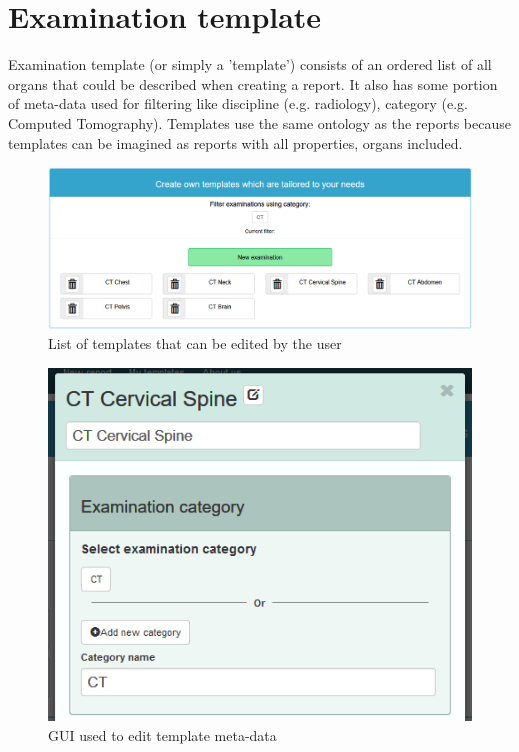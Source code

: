 \documentclass[12pt, twoside, openany]{report}
\theoremstyle{definition}
\begin{document}
\section{Examination template}
Examination template (or simply a 'template') consists of an ordered list of all organs that could be described when creating a report. It also has some portion of meta-data used for filtering like discipline (e.g. radiology), category (e.g. Computed Tomography). Templates use the same ontology as the reports because templates can be imagined as reports with all properties, organs included. 

\begin{figure}
    \centering
    \includegraphics[width=0.9\linewidth]{templates-list}
    \caption{List of templates that can be edited by the user\label{fig:templates-list}}
\end{figure}
\begin{figure}
    \centering
    \includegraphics{template-metadata}
    \caption{GUI used to edit template meta-data \label{fig:template-metadata}}
\end{figure}
\end{document}
